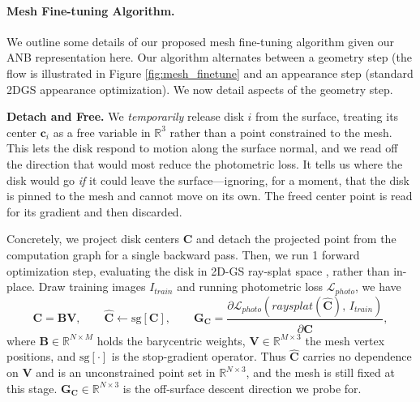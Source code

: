 \paragraph{Mesh Fine-tuning Algorithm.}
We outline some details of our proposed mesh fine-tuning algorithm given our ANB representation here. Our algorithm alternates between a geometry step (the flow is illustrated in Figure \ref{fig:mesh_finetune} and an appearance step (standard 2DGS appearance optimization). We now detail aspects of the geometry step.



\textbf{Detach and Free.} We \emph{temporarily} release disk $i$ from the
surface, treating its center $\mathbf{c}_i$ as a free variable in
$\mathbb{R}^3$ rather than a point constrained to the mesh. This lets the
disk respond to motion along the surface normal, and we read off the direction that
would most reduce the photometric loss. It tells us where the disk would go
\emph{if} it could leave the surface---ignoring, for a moment, that the disk
is pinned to the mesh and cannot move on its own. The freed center point is read
for its gradient and then discarded.

Concretely, we project disk centers $\mathbf{C}$ and detach the projected point from the computation graph for a single
backward pass. Then, we run 1 forward optimization step, evaluating the disk in 2D-GS ray-splat space \cite{2DGS}, rather than in-place. Draw training images $I_{train}$ and running photometric loss $\mathcal{L}_{photo}$, we have
%
\begin{equation}
  \mathbf{C} = \mathbf{B}\mathbf{V},
  \qquad
  \hat{\mathbf{C}} \leftarrow \mathrm{sg}\!\left[\mathbf{C}\right],
  \qquad
  \mathbf{G}_{\mathbf{C}}
  = \frac{\partial \mathcal{L}_{photo}\!\left(
      raysplat(\hat{\mathbf{C}}),\, I_{train}
    \right)}{\partial \hat{\mathbf{C}}},
\end{equation}
%
where $\mathbf{B} \in \mathbb{R}^{N \times M}$ holds the barycentric weights,
$\mathbf{V} \in \mathbb{R}^{M \times 3}$ the mesh vertex positions, and
$\mathrm{sg}[\cdot]$ is the stop-gradient operator. Thus $\hat{\mathbf{C}}$ carries no dependence on $\mathbf{V}$ and
is an unconstrained point set in $\mathbb{R}^{N \times 3}$, and the mesh is still fixed at this stage. $\mathbf{G}_{\mathbf{C}} \in \mathbb{R}^{N \times 3}$ is the off-surface
descent direction we probe for. %

